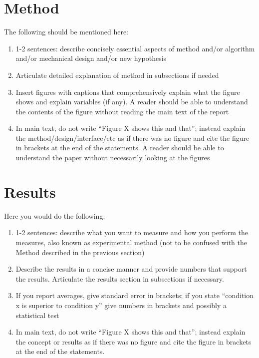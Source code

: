 \documentclass[lettersize,journal]{IEEEtran}
\begin{document}
\section{Method}
The following should be mentioned here:
\begin{enumerate}
    \item 1-2 sentences: describe concisely essential aspects of method and/or algorithm and/or mechanical design and/or new hypothesis
    \item Articulate detailed explanation of method in subsections if needed
    \item Insert figures with captions that comprehensively explain what the figure shows and explain variables (if any). A reader should be able to understand the contents of the figure without reading the main text of the report
    \item In main text, do not write “Figure X shows this and that”; instead explain the method/design/interface/etc as if there was no figure and cite the figure in brackets at the end of the statements. A reader should be able to understand the paper without necessarily looking at the figures
\end{enumerate}

\section{Results}
Here you would do the following:
\begin{enumerate}
    \item 1-2 sentences: describe what you want to measure and how you perform the measures, also known as experimental method (not to be confused with the Method described in the previous section)
    \item Describe the results in a concise manner and provide numbers that support the results. Articulate the results section in subsections if necessary.
    \item If you report averages, give standard error in brackets; if you state “condition x is superior to condition y” give numbers in brackets and possibly a statistical test
    \item In main text, do not write “Figure X shows this and that”; instead explain the concept or results as if there was no figure and cite the figure in brackets at the end of the statements.
\end{enumerate}
\end{document}
